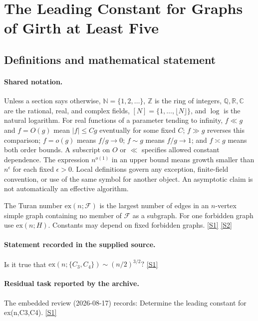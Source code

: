 \documentclass[11pt,a4paper]{article}
\newcommand{\N}{\mathbb{N}}
\newcommand{\Z}{\mathbb{Z}}
\newcommand{\Q}{\mathbb{Q}}
\newcommand{\R}{\mathbb{R}}
\newcommand{\C}{\mathbb{C}}
\newcommand{\sref}[2]{\hyperlink{source:#1:#2}{[S#2]}}
\begin{document}
\section{The Leading Constant for Graphs of Girth at Least Five}\label{statement}


\subsection{Definitions and mathematical statement}

\paragraph{Shared notation.}Unless a section says otherwise, $\N=\{1,2,\ldots\}$,
$\Z$ is the ring of integers, $\Q,\R,\C$ are the rational, real, and complex
fields, $[N]=\{1,\ldots,\lfloor N\rfloor\}$, and $\log$ is the natural
logarithm. For real functions of a parameter tending to infinity,
$f\ll g$ and $f=O(g)$ mean $|f|\leq Cg$ eventually for some fixed $C$;
$f\gg g$ reverses this comparison; $f=o(g)$ means $f/g\to0$;
$f\sim g$ means $f/g\to1$; and $f\asymp g$ means both order bounds.
A subscript on $O$ or $\ll$ specifies allowed constant dependence.
The expression $n^{o(1)}$ in an upper bound means growth smaller than
$n^\epsilon$ for each fixed $\epsilon>0$. Local definitions govern any
exception, finite-field convention, or use of the same symbol for another
object. An asymptotic claim is not automatically an effective algorithm.



The Turan number $\mathrm{ex}(n;\mathcal F)$ is the largest number of edges in an $n$-vertex simple graph containing no member of $\mathcal F$ as a subgraph. For one forbidden graph use $\mathrm{ex}(n;H)$. Constants may depend on fixed forbidden graphs. \sref{statement}{1} \sref{statement}{2}

\paragraph{Statement recorded in the supplied source.}
Is it true that $ \mathrm{ex}(n;\{C_3,C_4\})\sim (n/2)^{3/2}? $ \sref{statement}{1}

\paragraph{Residual task reported by the archive.}

The embedded review (2026-08-17) records: Determine the leading constant for ex(n,{C3,C4}). \sref{statement}{1}
\end{document}
